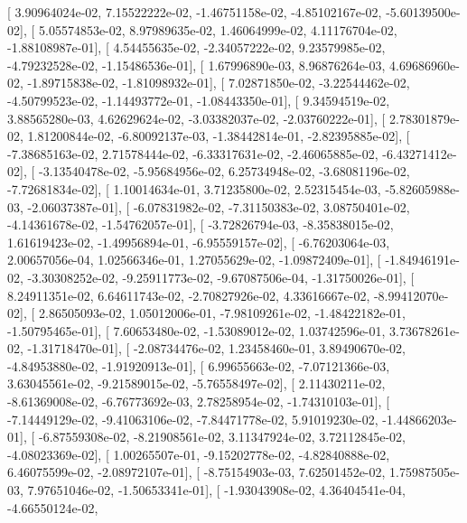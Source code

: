 \documentclass{article}
\begin{document}
       [  3.90964024e-02,   7.15522222e-02,  -1.46751158e-02,
         -4.85102167e-02,  -5.60139500e-02],
       [  5.05574853e-02,   8.97989635e-02,   1.46064999e-02,
          4.11176704e-02,  -1.88108987e-01],
       [  4.54455635e-02,  -2.34057222e-02,   9.23579985e-02,
         -4.79232528e-02,  -1.15486536e-01],
       [  1.67996890e-03,   8.96876264e-03,   4.69686960e-02,
         -1.89715838e-02,  -1.81098932e-01],
       [  7.02871850e-02,  -3.22544462e-02,  -4.50799523e-02,
         -1.14493772e-01,  -1.08443350e-01],
       [  9.34594519e-02,   3.88565280e-03,   4.62629624e-02,
         -3.03382037e-02,  -2.03760222e-01],
       [  2.78301879e-02,   1.81200844e-02,  -6.80092137e-03,
         -1.38442814e-01,  -2.82395885e-02],
       [ -7.38685163e-02,   2.71578444e-02,  -6.33317631e-02,
         -2.46065885e-02,  -6.43271412e-02],
       [ -3.13540478e-02,  -5.95684956e-02,   6.25734948e-02,
         -3.68081196e-02,  -7.72681834e-02],
       [  1.10014634e-01,   3.71235800e-02,   2.52315454e-03,
         -5.82605988e-03,  -2.06037387e-01],
       [ -6.07831982e-02,  -7.31150383e-02,   3.08750401e-02,
         -4.14361678e-02,  -1.54762057e-01],
       [ -3.72826794e-03,  -8.35838015e-02,   1.61619423e-02,
         -1.49956894e-01,  -6.95559157e-02],
       [ -6.76203064e-03,   2.00657056e-04,   1.02566346e-01,
          1.27055629e-02,  -1.09872409e-01],
       [ -1.84946191e-02,  -3.30308252e-02,  -9.25911773e-02,
         -9.67087506e-04,  -1.31750026e-01],
       [  8.24911351e-02,   6.64611743e-02,  -2.70827926e-02,
          4.33616667e-02,  -8.99412070e-02],
       [  2.86505093e-02,   1.05012006e-01,  -7.98109261e-02,
         -1.48422182e-01,  -1.50795465e-01],
       [  7.60653480e-02,  -1.53089012e-02,   1.03742596e-01,
          3.73678261e-02,  -1.31718470e-01],
       [ -2.08734476e-02,   1.23458460e-01,   3.89490670e-02,
         -4.84953880e-02,  -1.91920913e-01],
       [  6.99655663e-02,  -7.07121366e-03,   3.63045561e-02,
         -9.21589015e-02,  -5.76558497e-02],
       [  2.11430211e-02,  -8.61369008e-02,  -6.76773692e-03,
          2.78258954e-02,  -1.74310103e-01],
       [ -7.14449129e-02,  -9.41063106e-02,  -7.84471778e-02,
          5.91019230e-02,  -1.44866203e-01],
       [ -6.87559308e-02,  -8.21908561e-02,   3.11347924e-02,
          3.72112845e-02,  -4.08023369e-02],
       [  1.00265507e-01,  -9.15202778e-02,  -4.82840888e-02,
          6.46075599e-02,  -2.08972107e-01],
       [ -8.75154903e-03,   7.62501452e-02,   1.75987505e-03,
          7.97651046e-02,  -1.50653341e-01],
       [ -1.93043908e-02,   4.36404541e-04,  -4.66550124e-02,
\end{document}
